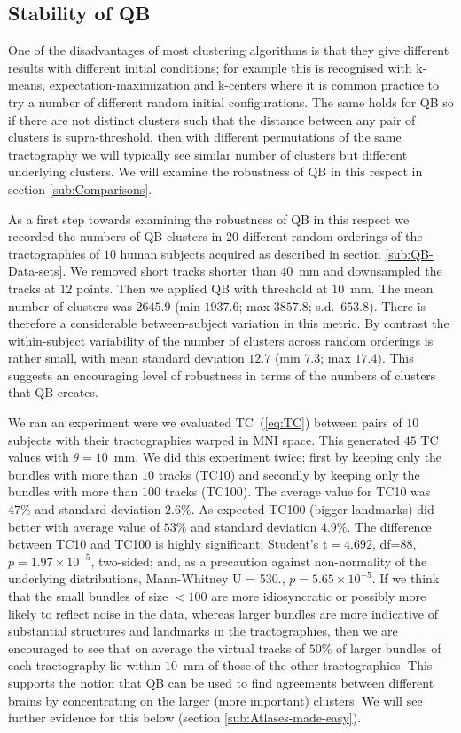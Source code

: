 \documentclass[journal]{IEEEtran}
\begin{document}
\subsection{Stability of QB\label{sub:Comparisons}}

One of the disadvantages of most clustering algorithms is that they give
different results with different initial conditions; for example this is
recognised with k-means, expectation-maximization
\cite{dempster1977maximum} and k-centers \cite{gonzalez1985clustering}
where it is common practice to try a number of different random initial
configurations. The same holds for QB so if there are not distinct
clusters such that the distance between any pair of clusters is
supra-threshold, then with different permutations of the same
tractography we will typically see similar number of clusters but
different underlying clusters. We will examine the robustness of QB in
this respect in section \ref{sub:Comparisons}.

As a first step towards examining the robustness of QB in this respect
we recorded the numbers of QB clusters in $20$ different random
orderings of the tractographies of $10$ human subjects acquired as
described in section \ref{sub:QB-Data-sets}. We removed short tracks
shorter than $40$~mm and downsampled the tracks at $12$ points. Then we
applied QB with threshold at $10$~mm. The mean number of clusters was
$2645.9$ (min $1937.6$; max $3857.8$; s.d.~$653.8$). There is therefore
a considerable between-subject variation in this metric. By contrast the
within-subject variability of the number of clusters across random
orderings is rather small, with mean standard deviation $12.7$ (min
$7.3$; max $17.4$). This suggests an encouraging level of robustness in
terms of the numbers of clusters that QB creates.

We ran an experiment were we evaluated TC~(\ref{eq:TC}) between pairs of
$10$ subjects with their tractographies warped in MNI space. This
generated $45$ TC values with $\theta=10$~mm. We did
this experiment twice; first by keeping only the bundles with more than
$10$ tracks (TC10) and secondly by keeping only the bundles with more
than $100$ tracks (TC100). The average value for TC10 was $47\%$ and
standard deviation $2.6\%$. As expected TC100 (bigger landmarks) did
better with average value of $53\%$ and standard deviation $4.9\%$. The
difference between TC10 and TC100 is highly significant: Student's
t$=4.692$, df=88, $p=1.97\times10^{-5}$, two-sided; and, as a precaution
against non-normality of the underlying distributions, Mann-Whitney U =
530., $p=5.65\times10^{-5}$. If we think that the small bundles of size
$<100$ are more idiosyncratic or possibly more likely to reflect noise
in the data, whereas larger bundles are more indicative of substantial
structures and landmarks in the tractographies, then we are encouraged
to see that on average the virtual tracks of $50\%$ of larger bundles of
each tractography lie within $10$~mm of those of the other
tractographies. This supports the notion that QB can be used to find
agreements between different brains by concentrating on the larger (more
important) clusters. We will see further evidence for this below
(section \ref{sub:Atlases-made-easy}).
\end{document}
